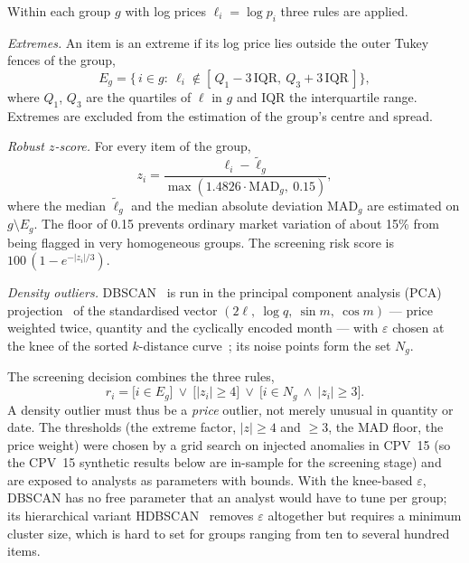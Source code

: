 \documentclass[conference]{IEEEtran}
\begin{document}
Within each group $g$ with log prices $\ell_i=\log p_i$ three rules are applied.

\emph{Extremes.} An item is an extreme if its log price lies outside the outer Tukey fences of the group,
\begin{equation}
E_g=\bigl\{\,i\in g:\ \ell_i\notin[\,Q_1-3\,\mathrm{IQR},\ Q_3+3\,\mathrm{IQR}\,]\bigr\},
\label{eq:extremes}
\end{equation}
where $Q_1$, $Q_3$ are the quartiles of $\ell$ in $g$ and IQR the interquartile range. Extremes are
excluded from the estimation of the group's centre and spread.

\emph{Robust $z$-score.} For every item of the group,
\begin{equation}
z_i=\frac{\ell_i-\tilde\ell_g}{\max\left(1.4826\cdot\mathrm{MAD}_g,\ 0.15\right)},
\end{equation}
where the median $\tilde\ell_g$ and the median absolute deviation $\mathrm{MAD}_g$ are estimated on
$g\setminus E_g$. The floor of 0.15 prevents ordinary market variation of about 15\% from being flagged in
very homogeneous groups. The screening risk score is $100\,(1-e^{-|z_i|/3})$.

\emph{Density outliers.} DBSCAN~\cite{ester1996dbscan} is run in the principal component analysis (PCA) projection~\cite{jolliffe2016pca}
of the standardised vector $(2\ell,\ \log q,\ \sin m,\ \cos m)$ --- price weighted twice, quantity and the
cyclically encoded month --- with $\varepsilon$ chosen at the knee of the sorted $k$-distance
curve~\cite{satopaa2011kneedle}; its noise points form the set $N_g$.

The screening decision combines the three rules,
\begin{equation}
r_i=\bigl[i\in E_g\bigr]\ \lor\ \bigl[|z_i|\ge4\bigr]\ \lor\ \bigl[i\in N_g\ \land\ |z_i|\ge3\bigr].
\end{equation}
A density outlier must thus be a \emph{price} outlier, not merely unusual in quantity or date. The thresholds
(the extreme factor, $|z|\ge4$ and $\ge3$, the MAD floor, the price weight) were chosen by a grid search on
injected anomalies in CPV~15 (so the CPV~15 synthetic results below are in-sample for the screening
stage) and are exposed to analysts as parameters with bounds. With the
knee-based $\varepsilon$, DBSCAN has no free parameter that an analyst would have to tune per group;
its hierarchical variant HDBSCAN~\cite{campello2013hdbscan} removes $\varepsilon$ altogether but requires a
minimum cluster size, which is hard to set for groups ranging from ten to several hundred items.
\end{document}
